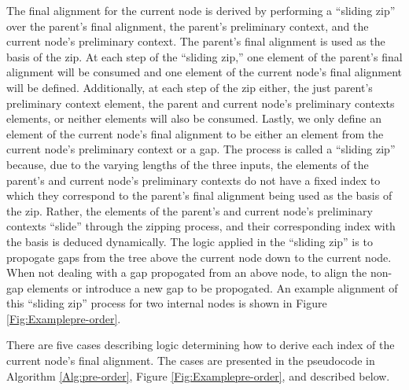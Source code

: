 \documentclass{bmcart}
\begin{document}
The final alignment for the current node is derived by performing a ``sliding zip'' over the parent's final alignment, the parent's preliminary context, and the current node's preliminary context.
The parent's final alignment is used as the basis of the zip.
At each step of the ``sliding zip,'' one element of the parent's final alignment will be consumed and one element of the current node's final alignment will be defined.
Additionally, at each step of the zip either, the just parent's preliminary context element, the parent and current node's preliminary contexts elements, or neither elements will also be consumed.
Lastly, we only define an element of the current node's final alignment to be either an element from the current node's preliminary context or a gap.
The process is called a ``sliding zip'' because, due to the varying lengths of the three inputs, the elements of the parent's and current node's preliminary contexts do not have a fixed index to which they correspond to the parent's final alignment being used as the basis of the zip.
Rather, the elements of the parent's and current node's preliminary contexts ``slide'' through the zipping process, and their corresponding index with the basis is deduced dynamically.
The logic applied in the ``sliding zip'' is to propogate gaps from the tree above the current node down to the current node. When not dealing with a gap propogated from an above node, to align the non-gap elements or introduce a new gap to be propogated.
An example alignment of this ``sliding zip'' process for two 
internal nodes is shown in Figure \ref{Fig:Examplepre-order}.

There are five cases describing logic determining how to derive each index of the current node's final alignment. The cases are presented in the pseudocode in Algorithm \ref{Alg:pre-order}, Figure \ref{Fig:Examplepre-order}, and described below.
\end{document}
